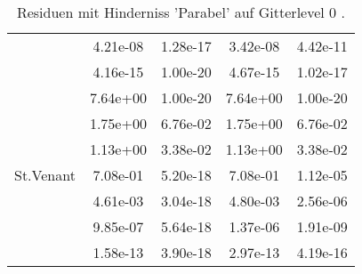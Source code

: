 \begin{table}
\begin{tabular}{c|cc|cc|}
\multicolumn{1}{|c|}{} & \multicolumn{1}{|c|}{  4.21e-08} & \multicolumn{1}{|c|}{  1.28e-17} & \multicolumn{1}{|c|}{  3.42e-08} & \multicolumn{1}{|c|}{  4.42e-11} \\ 
\multicolumn{1}{|c|}{} & \multicolumn{1}{|c|}{  4.16e-15} & \multicolumn{1}{|c|}{  1.00e-20} & \multicolumn{1}{|c|}{  4.67e-15} & \multicolumn{1}{|c|}{  1.02e-17} \\ 
\hline 
\multicolumn{1}{|c|}{\multirow{7}{*}{St.Venant}} &\multicolumn{1}{|c|}{  7.64e+00} & \multicolumn{1}{|c|}{  1.00e-20} & \multicolumn{1}{|c|}{  7.64e+00} & \multicolumn{1}{|c|}{  1.00e-20} \\ 
\multicolumn{1}{|c|}{} & \multicolumn{1}{|c|}{  1.75e+00} & \multicolumn{1}{|c|}{  6.76e-02} & \multicolumn{1}{|c|}{  1.75e+00} & \multicolumn{1}{|c|}{  6.76e-02} \\ 
\multicolumn{1}{|c|}{} & \multicolumn{1}{|c|}{  1.13e+00} & \multicolumn{1}{|c|}{  3.38e-02} & \multicolumn{1}{|c|}{  1.13e+00} & \multicolumn{1}{|c|}{  3.38e-02} \\ 
\multicolumn{1}{|c|}{} & \multicolumn{1}{|c|}{  7.08e-01} & \multicolumn{1}{|c|}{  5.20e-18} & \multicolumn{1}{|c|}{  7.08e-01} & \multicolumn{1}{|c|}{  1.12e-05} \\ 
\multicolumn{1}{|c|}{} & \multicolumn{1}{|c|}{  4.61e-03} & \multicolumn{1}{|c|}{  3.04e-18} & \multicolumn{1}{|c|}{  4.80e-03} & \multicolumn{1}{|c|}{  2.56e-06} \\ 
\multicolumn{1}{|c|}{} & \multicolumn{1}{|c|}{  9.85e-07} & \multicolumn{1}{|c|}{  5.64e-18} & \multicolumn{1}{|c|}{  1.37e-06} & \multicolumn{1}{|c|}{  1.91e-09} \\ 
\multicolumn{1}{|c|}{} & \multicolumn{1}{|c|}{  1.58e-13} & \multicolumn{1}{|c|}{  3.90e-18} & \multicolumn{1}{|c|}{  2.97e-13} & \multicolumn{1}{|c|}{  4.19e-16} \\ 
\hline 
\end{tabular}\caption{Residuen mit Hinderniss 'Parabel' auf Gitterlevel 0 .}\label{tab:Residuum_Parabel_level0}
\end{table} 
